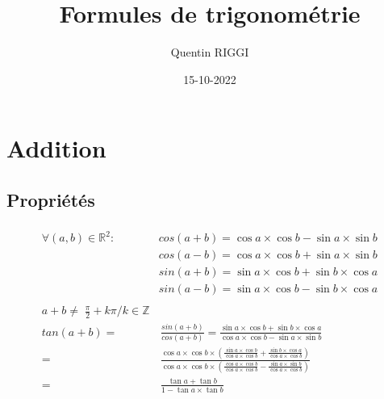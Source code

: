 \documentclass[a4paper, 12pt]{article}
\title{\color{dark-red}\huge\textbf{Formules de trigonométrie}}
\date{15-10-2022}
\author{Quentin RIGGI}
\begin{document}
	\maketitle
	\section{Addition}
	\vspace{-1cm}
	\begin{center}
		\item \subsection*{Propriétés}
	
		\vspace{-0.4cm}

		\normalsize\begin{gather*}
			\begin{split}
				\forall (a, b)\in\mathbb{R}^2:\;&cos\left(a+b\right) = \cos{a}\times\cos{b} - \sin{a}\times\sin{b}\\
				&cos\left(a-b\right) = \cos{a}\times\cos{b} + \sin{a}\times\sin{b}\\
				&sin\left(a+b\right) = \sin{a}\times\cos{b} + \sin{b}\times\cos{a}\\
				&sin\left(a-b\right) = \sin{a}\times\cos{b} - \sin{b}\times\cos{a}\\
				\\
				a+b\neq\;\frac{\pi}{2}+k\pi/k\in\mathbb{Z}\\
				tan\left(a+b\right) =&\, \frac{sin\left(a+b\right)}{cos\left(a+b\right)} = \frac{\sin{a}\times\cos{b}+\sin{b}\times\cos{a}}{\cos{a}\times\cos{b}-\sin{a}\times\sin{b}}\\
				=&\, \frac{\cos{a}\times\cos{b}\times\left(\frac{\sin{a}\times\cos{b}}{\cos{a}\times\cos{b}}+\frac{\sin{b}\times\cos{a}}{\cos{a}\times\cos{b}}\right)}{\cos{a}\times\cos{b}\times\left(\frac{\cos{a}\times\cos{b}}{\cos{a}\times\cos{b}}-\frac{\sin{a}\times\sin{b}}{\cos{a}\times\cos{b}}\right)}\\
				=&\,\frac{\tan{a}+\tan{b}}{1-\tan{a}\times\tan{b}}\\
			\end{split}
		\end{gather*}

		\vspace{0.2cm}


\end{center}
\end{document}

